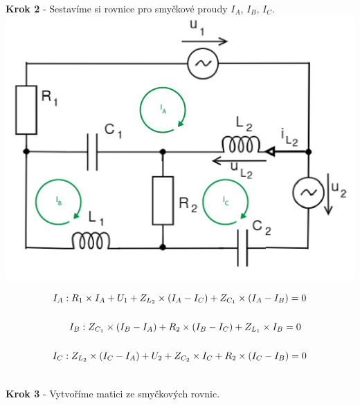 \begin{center}
\textbf{Krok 2} - Sestavíme si rovnice pro smyčkové proudy $I_A$, $I_B$, $I_C$. \\
\vspace{0.7cm}
\includegraphics[scale=0.5,keepaspectratio]{fig/Pr4_steps/Pr4_step02.png}
\end{center}

\begin{gather*}
I_A: R_1 \times I_A  + U_1  + Z_{L_2} \times (I_A - I_C) +  Z_{C_1} \times (I_A - I_B) = 0 \\\\
\newline
\newline
I_B: Z_{C_1} \times (I_B - I_A) + R_2 \times (I_B - I_C) + Z_{L_1} \times I_B = 0 \\\\
\newline
\newline
I_C: Z_{L_2} \times (I_C - I_A) + U_2 + Z_{C_2} \times I_C + R_2 \times (I_C - I_B) = 0 \\\\
\end{gather*}

\begin{center}
\textbf{Krok 3} - Vytvoříme matici ze smyčkových rovnic. \\
\end{center}

